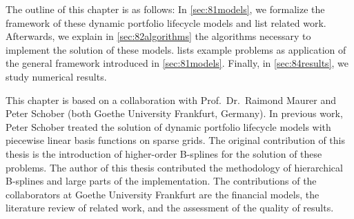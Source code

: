The outline of this chapter is as follows:
In \cref{sec:81models}, we formalize the framework of
these dynamic portfolio lifecycle models and list related work.
Afterwards, we explain in \cref{sec:82algorithms} the algorithms
necessary to implement the solution of these models.
 lists example problems as application
of the general framework introduced in \cref{sec:81models}.
Finally, in \cref{sec:84results}, we study numerical results.

This chapter is based on a collaboration with Prof.\ Dr.\ Raimond Maurer
and Peter Schober (both Goethe University Frankfurt, Germany).
In previous work, Peter Schober treated the solution of
dynamic portfolio lifecycle models with piecewise linear basis functions
on sparse grids.
The original contribution of this thesis is the introduction
of higher-order B-splines for the solution of these problems.
The author of this thesis contributed the methodology of
hierarchical B-splines and large parts of the implementation.
The contributions of the collaborators at Goethe University Frankfurt
are the financial models, the literature review of related work,
and the assessment of the quality of results.






\cleardoublepage
